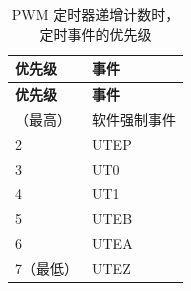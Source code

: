 \begin{longtable}[c]{|p{6cm}|p{6cm}|}
    \caption{PWM 定时器递增计数时，定时事件的优先级}
    \label{tab:mcpwm-evt-prio-u}
    \\\hline
    \rowcolor{lightgray}
    \textbf{优先级}
    & \textbf{事件}
    \\\hline
    \endfirsthead
    \hline
    \rowcolor{lightgray}   
    \textbf{优先级}
    & \textbf{事件}
    \\\hline
    \endhead
    \hline
    \endfoot
    1（最高）
    & 软件强制事件
    \\\hline
    2
    & UTEP
    \\\hline
    3
    & UT0
    \\\hline
    4
    & UT1
    \\\hline
    5
    & UTEB
    \\\hline
    6
    & UTEA
    \\\hline
    7（最低）
    & UTEZ  
\end{longtable}